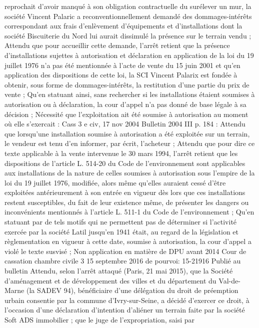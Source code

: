 \documentclass[11pt,a4paper]{report}
\begin{document}
	reprochait d'avoir manqué à son obligation contractuelle du surélever un mur, la société Vincent Palaric a
	reconventionnellement demandé des dommages-intérêts correspondant aux frais d'enlèvement d'équipements et
	d'installations dont la société Biscuiterie du Nord lui aurait dissimulé la présence sur le terrain vendu ;
	Attendu que pour accueillir cette demande, l'arrêt retient que la présence d'installations sujettes à autorisation
	et déclaration en application de la loi du 19 juillet 1976 n'a pas été mentionnée à l'acte de vente du 15 juin 2001
	et qu'en application des dispositions de cette loi, la SCI Vincent Palarix est fondée à obtenir, sous forme de
	dommages-intérêts, la restitution d'une partie du prix de vente ;
	Qu'en statuant ainsi, sans rechercher si les installations étaient soumises à autorisation ou à déclaration, la
	cour d'appel n'a pas donné de base légale à sa décision ;
	Nécessité que l’exploitation ait été soumise à autorisation au moment où elle s’exercait
	: Cass 3 e civ, 17 nov 2004 Bulletin 2004 III  p. 184 : Attendu que lorsqu'une installation soumise à
	autorisation a été exploitée sur un terrain, le vendeur est tenu d'en informer, par écrit, l'acheteur ;
	Attendu que pour dire ce texte applicable à la vente intervenue le 30 mars 1994, l'arrêt retient que les
	dispositions de l'article L. 514-20 du Code de l'environnement sont applicables aux installations de la nature de
	celles soumises à autorisation sous l'empire de la loi du 19 juillet 1976, modifiée, alors même qu'elles auraient
	cessé d'être exploitées antérieurement à son entrée en vigueur dès lors que ces installations restent susceptibles,
	du fait de leur existence même, de présenter les dangers ou inconvénients mentionnés à l'article L. 511-1 du
	Code de l'environnement ;
	Qu'en statuant par de tels motifs qui ne permettent pas de déterminer si l'activité exercée par la société Latil
	jusqu'en 1941 était, au regard de la législation et règlementation en vigueur à cette date, soumise à autorisation,
	la cour d'appel a violé le texte susvisé ;
	Non application en matière de DPU avant 2014
	Cour de cassation chambre civile 3 15 septembre 2016 \No  de pourvoi: 15-21916 Publié au bulletin
	Attendu, selon l'arrêt attaqué (Paris, 21 mai 2015), que la Société d'aménagement et de développement des villes
	et du département du Val-de-Marne (la SADEV 94), bénéficiaire d'une délégation du droit de préemption urbain
	consentie par la commune d'Ivry-sur-Seine, a décidé d'exercer ce droit, à l'occasion d'une déclaration
	d'intention d'aliéner un terrain faite par la société Soft ADS immobilier ; que le juge de l'expropriation, saisi par
\end{document}
